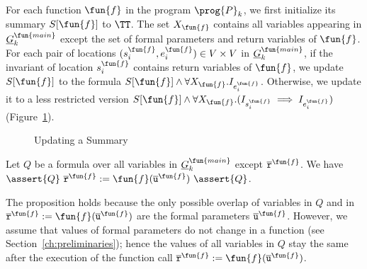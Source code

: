 For each function $\fun{f}$ in the program $\prog{P}_k$,
we first initialize its summary $S[\fun{f}]$ to $\TT$.
The set $X_\fun{f}$ contains all variables appearing in
$\underline{G}^{\fun{main}}_k$ except the set of formal parameters and return
variables of $\fun{f}$.
For each pair of locations $(s_i^\fun{f},e_i^\fun{f})\in V\times V$ in $\underline{G}^{\fun{main}}_k$,
if the invariant of location $s_i^\fun{f}$ contains return variables of $\fun{f}$,
we update $S[\fun{f}]$ to the formula $S[\fun{f}]\wedge \forall X_\fun{f}.I_{e_i^\fun{f}}$.
Otherwise, we update it to a less restricted version $S[\fun{f}]\wedge \forall X_\fun{f}. (I_{s_i^\fun{f}} \implies I_{e_i^\fun{f}})$ (Figure~\ref{figure:updating-summary}).

\begin{figure}[t]
  \centering

  \caption{Updating a Summary}
  \label{figure:updating-summary}
\end{figure}
\begin{proposition}
\label{propposition:invariant}
Let $Q$ be a formula over all variables in $\underline{G}^{\fun{main}}_k$ except $\mathtt{\overline{r}}^\fun{f}$.
We have $\assert{Q}\
  \mathtt{\overline{r}}^\fun{f} := \fun{f}
  (\overline{\mathtt{u}}^\fun{f})\ \assert{Q}$.
\end{proposition}
The proposition holds because the only possible overlap of variables in $Q$ and
in $\mathtt{\overline{r}}^\fun{f} := \fun{f} (\overline{\mathtt{u}}^\fun{f})$
are the formal parameters $\overline{\mathtt{u}}^\fun{f}$.
However, we assume that values of formal parameters do not change in a function
(see Section~\ref{ch:preliminaries});
hence the values of all variables in $Q$ stay the same after the execution of
the function call $\mathtt{\overline{r}}^\fun{f} := \fun{f} (\overline{\mathtt{u}}^\fun{f})$.

